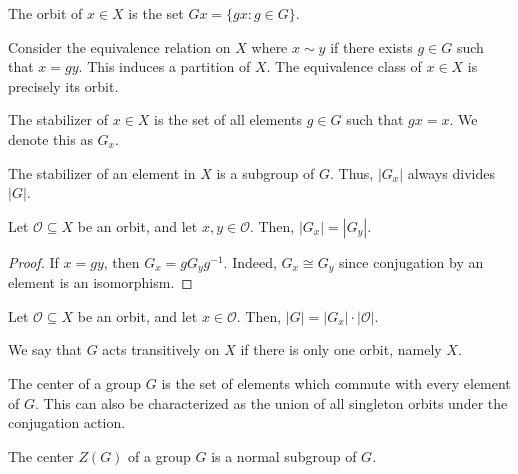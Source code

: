 \documentclass[11pt]{article}
\theoremstyle{definition}
\theoremstyle{remark}
\numberwithin{equation}{section}
\begin{document}
    \begin{definition}
        The orbit of $x \in X$ is the set $Gx = \{gx : g \in G\}$.

        Consider the equivalence relation on $X$ where $x \sim y$ if there exists $g
        \in G$ such that $x = gy$. This induces a partition of $X$. The equivalence
        class of $x \in X$ is precisely its orbit.
    \end{definition}

    \begin{definition}
        The stabilizer of $x \in X$ is the set of all elements $g \in G$ such that
        $gx = x$. We denote this as $G_x$.
    \end{definition}

    \begin{lemma}
        The stabilizer of an element in $X$ is a subgroup of $G$. Thus, $|G_x|$
        always divides $|G|$.
    \end{lemma}

    \begin{lemma}
        Let $\mathscr{O} \subseteq X$ be an orbit, and let $x, y \in \mathscr{O}$.
        Then, $|G_x| = |G_y|$.
    \end{lemma}
    \begin{proof}
        If $x = gy$, then $G_x = gG_yg^{-1}$. Indeed, $G_x \cong G_y$ since
        conjugation by an element is an isomorphism.
    \end{proof}

    \begin{theorem}
        Let $\mathscr{O} \subseteq X$ be an orbit, and let $x \in \mathscr{O}$.
        Then, $|G| = |G_x|\cdot |\mathscr{O}|$.
    \end{theorem}

    \begin{definition}
        We say that $G$ acts transitively on $X$ if there is only one orbit, namely
        $X$.
    \end{definition}

    \begin{definition}
        The center of a group $G$ is the set of elements which commute with every
        element of $G$. This can also be characterized as the union of all singleton
        orbits under the conjugation action.
    \end{definition}

    \begin{lemma}
        The center $Z(G)$ of a group $G$ is a normal subgroup of $G$.
    \end{lemma}
\end{document}
